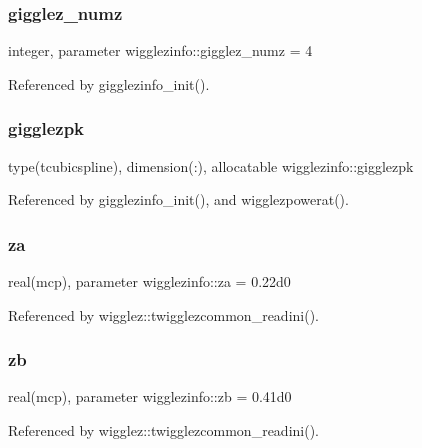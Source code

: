 \subsubsection{\texorpdfstring{gigglez\+\_\+numz}{gigglez\_numz}}
{\footnotesize\ttfamily integer, parameter wigglezinfo\+::gigglez\+\_\+numz = 4}



Referenced by gigglezinfo\+\_\+init().

\mbox{\label{namespacewigglezinfo_a6e6d78669da0432fe3a6e39caaf60e4c}} 
\subsubsection{\texorpdfstring{gigglezpk}{gigglezpk}}
{\footnotesize\ttfamily type(tcubicspline), dimension(\+:), allocatable wigglezinfo\+::gigglezpk}



Referenced by gigglezinfo\+\_\+init(), and wigglezpowerat().

\mbox{\label{namespacewigglezinfo_a5ee76ba0ebd66c8881b0128f64a73b98}} 
\subsubsection{\texorpdfstring{za}{za}}
{\footnotesize\ttfamily real(mcp), parameter wigglezinfo\+::za = 0.\+22d0}



Referenced by wigglez\+::twigglezcommon\+\_\+readini().

\mbox{\label{namespacewigglezinfo_a0caef290cd3d8b7306771479bd8589e5}} 
\subsubsection{\texorpdfstring{zb}{zb}}
{\footnotesize\ttfamily real(mcp), parameter wigglezinfo\+::zb = 0.\+41d0}



Referenced by wigglez\+::twigglezcommon\+\_\+readini().

\mbox{\label{namespacewigglezinfo_a6079d8a819afcd264b152ce14b1c9524}} 
